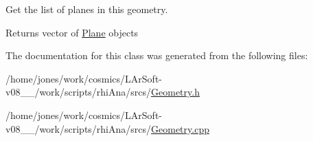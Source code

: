 Get the list of planes in this geometry. 

\begin{DoxyReturn}{Returns}
vector of \hyperlink{classcalib_1_1Plane}{Plane} objects 
\end{DoxyReturn}


The documentation for this class was generated from the following files\-:\begin{DoxyCompactItemize}
\item 
/home/jones/work/cosmics/\-L\-Ar\-Soft-\/v08\-\_\-\_/work/scripts/rhi\-Ana/srcs/\hyperlink{Geometry_8h}{Geometry.\-h}\item 
/home/jones/work/cosmics/\-L\-Ar\-Soft-\/v08\-\_\-\_/work/scripts/rhi\-Ana/srcs/\hyperlink{Geometry_8cpp}{Geometry.\-cpp}\end{DoxyCompactItemize}
